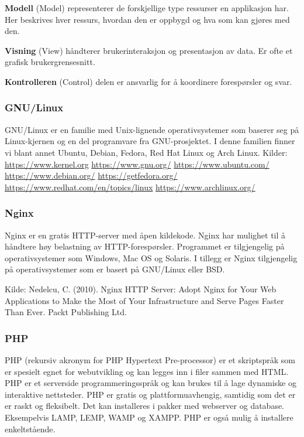 \textbf{Modell} (Model) representerer de forskjellige type ressurser en applikasjon har. Her beskrives hver ressurs, hvordan den er oppbygd og hva som kan gjøres med den.

\textbf{Visning} (View) håndterer brukerinteraksjon og presentasjon av data. Er ofte et grafisk brukergrensesnitt.

\textbf{Kontrolleren} (Control) delen er ansvarlig for å koordinere forespørsler og svar.

\subsubsection{GNU/Linux}
GNU/Linux er en familie med Unix-lignende operativsystemer som baserer seg på Linux-kjernen og en del programvare fra GNU-prosjektet.
I denne familien finner vi blant annet Ubuntu, Debian, Fedora, Red Hat Linux og Arch Linux.
Kilder: \url{https://www.kernel.org} \url{https://www.gnu.org/} \url{https://www.ubuntu.com/} \url{https://www.debian.org/} \url{https://getfedora.org/} \url{https://www.redhat.com/en/topics/linux} \url{https://www.archlinux.org/}

\subsubsection{Nginx}
Nginx er en gratis HTTP-server med åpen kildekode. Nginx har mulighet til å håndtere høy belastning av HTTP-forespørsler. Programmet er tilgjengelig på operativsystemer som Windows, Mac OS og Solaris. I tillegg er Nginx tilgjengelig på operativsystemer som er basert på GNU/Linux eller BSD.

Kilde: Nedelcu, C. (2010). Nginx HTTP Server: Adopt Nginx for Your Web Applications to Make the Most of Your Infrastructure and Serve Pages Faster Than Ever. Packt Publishing Ltd.

\subsubsection{PHP}
PHP (rekursiv akronym for PHP Hypertext Pre-processor) er et skriptspråk som er spesielt egnet for webutvikling og kan legges inn i filer sammen med HTML. PHP er et serverside programmeringsspråk og kan brukes til å lage dynamiske og interaktive nettsteder. PHP er gratis og plattformuavhengig, samtidig som det er  er raskt og fleksibelt. Det kan installeres i pakker med webserver og database. Eksempelvis LAMP, LEMP, WAMP og XAMPP. PHP er også mulig å installere enkeltstående. 

